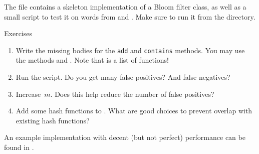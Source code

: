 \documentclass[12pt]{article}
\begin{document}
The file  contains a skeleton implementation of a Bloom filter class, as well as a small script to test it on words from  and . Make sure to run it from the  directory.
%
\begin{mybox}{Exercises}
    \begin{enumerate}
        \item Write the missing bodies for the \texttt{add} and \texttt{contains} methods. You may use the methods  and . Note that  is a list of functions!
        \item Run the script. Do you get many false positives? And false negatives?
        \item Increase~$m$. Does this help reduce the number of false positives?
        \item Add some hash functions to . What are good choices to prevent overlap with existing hash functions?
    \end{enumerate}
\end{mybox}

An example implementation with decent (but not perfect) performance can be found in .
\end{document}
